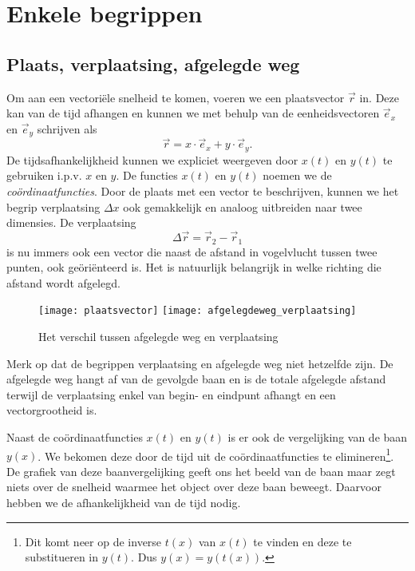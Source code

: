 \section{Enkele begrippen}

\subsection{Plaats, verplaatsing, afgelegde weg}

Om aan een vectori\"ele snelheid te komen, voeren we een plaatsvector $\vec{r}$ in. Deze kan van de tijd afhangen en kunnen we met behulp van de eenheidsvectoren $\vec{e}_x$ en $\vec{e}_y$ schrijven als
\begin{equation*}
 \vec{r}=x\cdot\vec{e}_x+y\cdot\vec{e}_y.
\end{equation*}
De tijdsafhankelijkheid kunnen we expliciet weergeven door $x(t)$ en $y(t)$ te gebruiken i.p.v. $x$ en $y$. De functies $x(t)$ en $y(t)$ noemen we de \emph{co\"ordinaat\-functies}. Door de plaats met een vector te beschrijven, kunnen we het begrip verplaatsing $\Delta x$ ook gemakkelijk en analoog uitbreiden naar twee dimensies. De verplaatsing
\begin{equation*}
\Delta\vec{r}=\vec{r}_2-\vec{r}_1
\end{equation*}
is nu immers ook een vector die naast de afstand in vogelvlucht tussen twee punten, ook ge\"ori\"enteerd is. Het is natuurlijk belangrijk in welke richting die afstand wordt afgelegd.
\begin{figure}[h]
\centering
\texttt{[image: plaatsvector]}
\texttt{[image: afgelegdeweg\_verplaatsing]}
\caption{Het verschil tussen afgelegde weg en verplaatsing}
\end{figure}
Merk op dat de begrippen verplaatsing en afgelegde weg niet hetzelfde zijn. De afgelegde weg hangt af van de gevolgde baan en is de totale afgelegde afstand terwijl de verplaatsing enkel van begin- en eindpunt afhangt en een vectorgrootheid is.

Naast de co\"ordinaatfuncties $x(t)$ en $y(t)$ is er ook de vergelijking van de baan $y(x)$. We bekomen deze door de tijd uit de co\"ordinaatfuncties te elimineren\footnote{Dit komt neer op de inverse $t(x)$ van $x(t)$ te vinden en deze te substitueren in $y(t)$. Dus $y(x)=y(t(x))$.}. De grafiek van deze baanvergelijking geeft ons het beeld van de baan maar zegt niets over de snelheid waarmee het object over deze baan beweegt. Daarvoor hebben we de afhankelijkheid van de tijd nodig.

